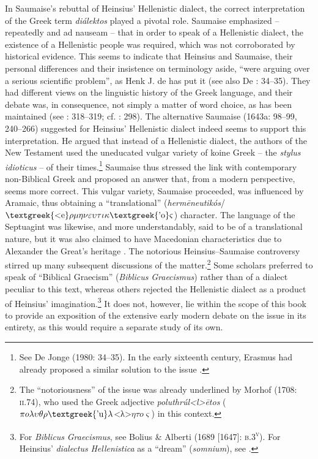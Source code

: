 \documentclass[output=paper]{langsci/langscibook}
\begin{document}
In Saumaise’s rebuttal of Heinsius’ Hellenistic dialect, the correct interpretation of the Greek term \textit{diálektos} played a pivotal role. Saumaise emphasized – repeatedly and ad nauseam – that in order to speak of a Hellenistic dialect, the existence of a Hellenistic people was required, which was not corroborated by historical evidence. This seems to indicate that Heinsius and Saumaise, their personal differences and their insistence on terminology aside, “were arguing over a serious scientific problem”, as Henk J. de \citet[117]{Jonge1981} has put it (see also De \citealt{Jonge1980}: 34–35). They had different views on the linguistic history of the Greek language, and their debate was, in consequence, not simply a matter of word choice, as has been maintained (see \citealt{Simon1689}: 318–319; cf. \citealt{Considine2012}: 298). The alternative Saumaise (1643a: 98–99, 240–266) suggested for Heinsius’ Hellenistic dialect indeed seems to support this interpretation. He argued that instead of a Hellenistic dialect, the authors of the New Testament used the uneducated vulgar variety of koine Greek – the \textit{stylus} \textit{idioticus} – of their times.\footnote{See De Jonge (1980: 34–35). In the early sixteenth century, Erasmus had already proposed a similar solution to the issue \citep[181]{Bentley1983}.} Saumaise thus stressed the link with contemporary non-Biblical Greek and proposed an answer that, from a modern perspective, seems more correct. This vulgar variety, Saumaise proceeded, was influenced by Aramaic, thus obtaining a “translational” (\textit{hermēneutikós}/$\text{\textgreek{<e}}\rho \mu \eta \nu \varepsilon \upsilon \tau \iota \kappa \text{\textgreek{'o}}\varsigma $) character. The language of the Septuagint was likewise, and more understandably, said to be of a translational nature, but it was also claimed to have Macedonian characteristics due to Alexander the Great’s heritage \citep[264]{Saumaise1643a}. The notorious Heinsius–Saumaise controversy stirred up many subsequent discussions of the matter.\footnote{The “notoriousness” of the issue was already underlined by Morhof (1708: \textsc{ii.}74), who used the Greek adjective \textit{poluthrúl<l>ētos}  ($\pi o\lambda \upsilon \theta \rho \text{\textgreek{'u}}\lambda $<λ>$\eta \tau o\varsigma $) in this context.} Some scholars preferred to speak of “Biblical Graecism” (\textit{Biblicus} \textit{Graecismus}) rather than of a dialect peculiar to this text, whereas others rejected the Hellenistic dialect as a product of Heinsius’ imagination.\footnote{For \textit{Biblicus} \textit{Graecismus}, see Bolius \& Alberti (1689 [1647]: \textsc{b.3}\textsc{\textsuperscript{v}}). For Heinsius’ \textit{dialectus} \textit{Hellenistica} as a “dream” (\textit{somnium}), see \citet{Croy1644}.} It does not, however, lie within the scope of this book to provide an exposition of the extensive early modern debate on the issue in its entirety, as this would require a separate study of its own.
\end{document}
